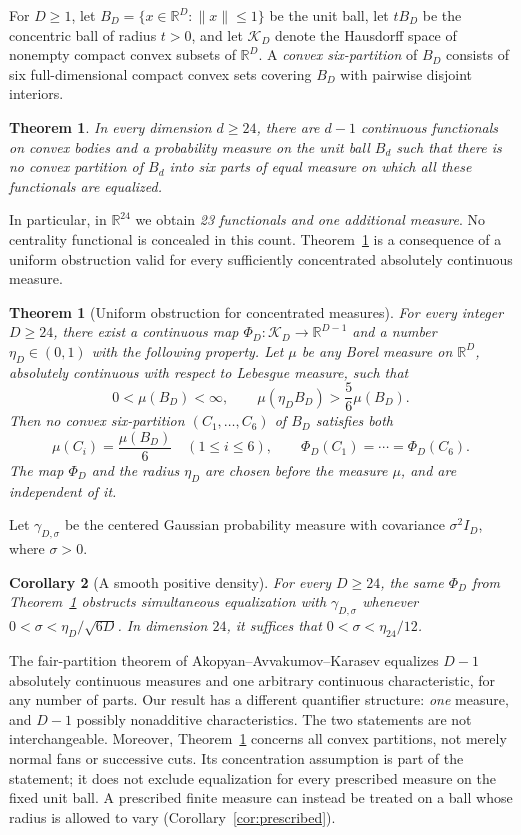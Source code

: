 \documentclass[a4paper,11pt,reqno]{amsart}
\newcommand{\R}{\mathbb R}
\newtheorem{mainthm}{Theorem}
\newtheorem{theorem}{Theorem}[section]
\newtheorem{corollary}[theorem]{Corollary}
\theoremstyle{definition}
\theoremstyle{remark}
\numberwithin{equation}{section}
\begin{document}
For $D\ge1$, let $B_D=\{x\in\R^D:\|x\|\le1\}$ be the unit ball,
let $tB_D$ be the concentric ball of radius $t>0$, and let $\mathcal K_D$
denote the Hausdorff space of nonempty compact convex subsets of $\R^D$.
A \emph{convex six-partition} of $B_D$ consists of six full-dimensional
compact convex sets covering $B_D$ with pairwise disjoint interiors.

\begin{mainthm}\label{thm:B}
In every dimension $d\ge24$, there are $d-1$ continuous functionals on
convex bodies and a probability measure on the unit ball $B_d$ such that
there is no convex partition of $B_d$ into six parts of equal measure on
which all these functionals are equalized.
\end{mainthm}

In particular, in $\R^{24}$ we obtain \emph{23 functionals and one
additional measure}. No centrality functional is concealed in this
count. Theorem~\ref{thm:B} is a consequence of a uniform obstruction
valid for every sufficiently concentrated absolutely continuous measure.

\begin{theorem}[Uniform obstruction for concentrated measures]\label{thm:concentrated}
For every integer $D\ge24$, there exist a continuous map
$\Phi_D:\mathcal K_D\to\R^{D-1}$ and a number $\eta_D\in(0,1)$ with the
following property. Let $\mu$ be any Borel measure on $\R^D$, absolutely
continuous with respect to Lebesgue measure, such that
\[
 0<\mu(B_D)<\infty,
 \qquad
 \mu(\eta_D B_D)>\frac56\mu(B_D).
\]
Then no convex six-partition $(C_1,\ldots,C_6)$ of $B_D$ satisfies both
\[
 \mu(C_i)=\frac{\mu(B_D)}6\quad(1\le i\le6),
 \qquad
 \Phi_D(C_1)=\cdots=\Phi_D(C_6).
\]
The map $\Phi_D$ and the radius $\eta_D$ are chosen before the measure
$\mu$, and are independent of it.
\end{theorem}

Let $\gamma_{D,\sigma}$ be the centered Gaussian probability measure
with covariance $\sigma^2I_D$, where $\sigma>0$.
\begin{corollary}[A smooth positive density]\label{cor:gaussian}
For every $D\ge24$, the same $\Phi_D$ from Theorem~\ref{thm:concentrated}
obstructs simultaneous equalization with $\gamma_{D,\sigma}$ whenever
$0<\sigma<\eta_D/\sqrt{6D}$. In dimension $24$, it suffices that
$0<\sigma<\eta_{24}/12$.
\end{corollary}

The fair-partition theorem of Akopyan--Avvakumov--Karasev
\cite[Theorem 7.1]{AAK} equalizes $D-1$ absolutely continuous measures
and one arbitrary continuous characteristic, for any number of parts.
Our result has a different quantifier structure: \emph{one} measure,
and $D-1$ possibly nonadditive characteristics. The two statements
are not interchangeable. Moreover, Theorem~\ref{thm:concentrated} concerns all
convex partitions, not merely normal fans or successive cuts. Its
concentration assumption is part of the statement; it does not
exclude equalization for every prescribed measure on the fixed unit
ball. A prescribed finite measure can instead be treated on a ball
whose radius is allowed to vary (Corollary~\ref{cor:prescribed}).
\end{document}
